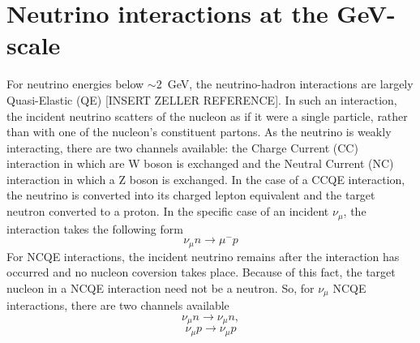 \section{Neutrino interactions at the GeV-scale}
\label{sec:NeutrinoInteractionsGeVScale}
For neutrino energies below $\sim$2~GeV, the neutrino-hadron interactions are largely Quasi-Elastic (QE) [INSERT ZELLER REFERENCE].  In such an interaction, the incident neutrino scatters of the nucleon as if it were a single particle, rather than with one of the nucleon's constituent partons.  As the neutrino is weakly interacting, there are two channels available: the Charge Current (CC) interaction in which are W boson is exchanged and the Neutral Current (NC) interaction in which a Z boson is exchanged.  In the case of a CCQE interaction, the neutrino is converted into its charged lepton equivalent and the target neutron converted to a proton.  In the specific case of an incident $\nu_\mu$, the interaction takes the following form
\begin{equation}
\nu_\mu n \rightarrow \mu^- p
\label{eq:CCQEInteraction}
\end{equation}
For NCQE interactions, the incident neutrino remains after the interaction has occurred and no nucleon coversion takes place.  Because of this fact, the target nucleon in a NCQE interaction need not be a neutron.  So, for $\nu_\mu$ NCQE interactions, there are two channels available
\begin{equation}
\nu_\mu n \rightarrow \nu_\mu n,
\label{eq:NCQEInteractionNeutronTarget}
\end{equation}
\begin{equation}
\nu_\mu p \rightarrow \nu_\mu p
\label{eq:NCQEInteractionProtonTarget}
\end{equation}

